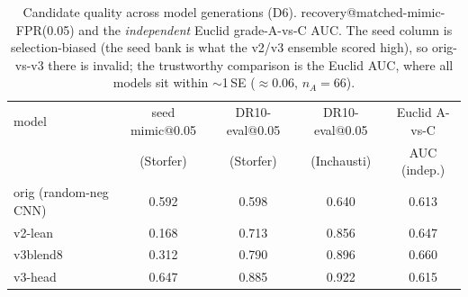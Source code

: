 \begin{table}[t]\centering
\caption{Candidate quality across model generations (D6). recovery@matched-mimic-FPR(0.05) and the \emph{independent} Euclid grade-A-vs-C AUC. The seed column is selection-biased (the seed bank is what the v2/v3 ensemble scored high), so orig-vs-v3 there is invalid; the trustworthy comparison is the Euclid AUC, where all models sit within $\sim$1\,SE ($\approx$0.06, $n_A{=}66$).}
\label{tab:progression}\small
\begin{tabular}{lcccc}
\toprule
model & seed mimic@0.05 & DR10-eval@0.05 & DR10-eval@0.05 & Euclid A-vs-C\\
 & (Storfer) & (Storfer) & (Inchausti) & AUC (indep.)\\
\midrule
orig (random-neg CNN) & 0.592 & 0.598 & 0.640 & 0.613\\
v2-lean & 0.168 & 0.713 & 0.856 & 0.647\\
v3blend8 & 0.312 & 0.790 & 0.896 & 0.660\\
v3-head & 0.647 & 0.885 & 0.922 & 0.615\\
\bottomrule
\end{tabular}
\end{table}
